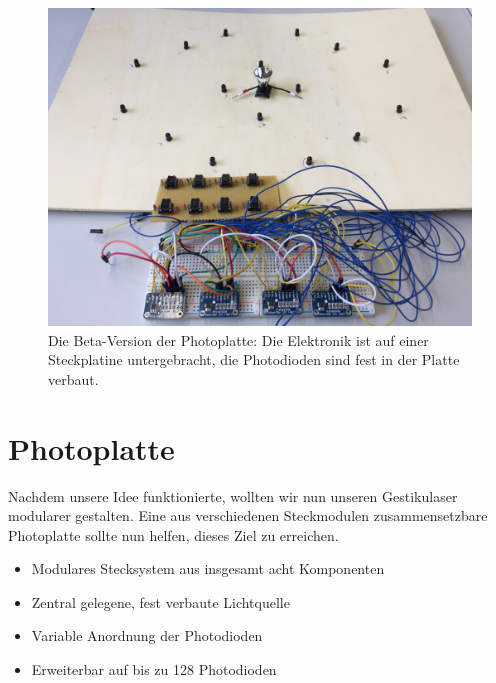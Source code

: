 \documentclass{sciposter}
\begin{document}
\begin{multicols}{3}
\begin{figure}[h]
	\centering
	\includegraphics[scale=0.175]{../figures/PhotoplatteBeta.jpeg}
	\caption{Die Beta-Version der Photoplatte: Die Elektronik ist auf einer Steckplatine untergebracht, die Photodioden sind fest in der Platte verbaut.}
	\label{fig:PhotoplatteBeta}
\end{figure}


\section{Photoplatte}
\noindent
Nachdem unsere Idee funktionierte, wollten wir nun unseren Gestikulaser modularer gestalten. Eine aus verschiedenen Steckmodulen zusammensetzbare Photoplatte sollte nun helfen, dieses Ziel zu erreichen.

\begin{itemize}
	\item Modulares Stecksystem aus insgesamt acht Komponenten
	\item Zentral gelegene, fest verbaute Lichtquelle
	\item Variable Anordnung der Photodioden
	\item Erweiterbar auf bis zu 128 Photodioden
\end{itemize}


\end{multicols}
\end{document}
